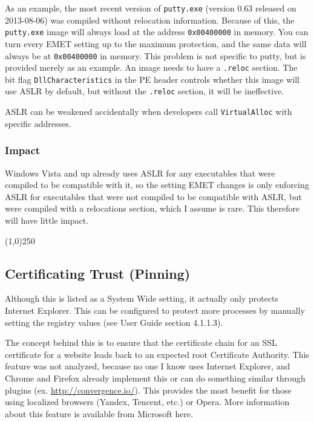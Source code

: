 \documentclass[]{article}
\newcommand{\sectionbreakline}[0]{\begin{center}\line(1,0){250}\end{center}}
\begin{document}
As an example, the most recent version of \texttt{putty.exe} (version 0.63 released on 2013-08-06) was compiled without relocation information. 
Because of this, the \texttt{putty.exe} image will always load at the address \texttt{0x00400000} in memory. You can turn every EMET setting up to the maximum protection, and the same data will always be at \texttt{0x00400000} in memory. This problem is not specific to putty, but is provided merely as an example. An image needs to have a \texttt{.reloc} section. 
The bit flag \texttt{DllCharacteristics} in the PE header controls whether this image will use ASLR by default, but without the \texttt{.reloc} section, it will be ineffective.

ASLR can be weakened accidentally when developers call \texttt{VirtualAlloc} with specific addresses.

\subsubsection{Impact}

Windows Vista and up already uses ASLR for any executables that were compiled to be compatible with it, so the setting EMET changes is only enforcing ASLR for executables that were not compiled to be compatible with ASLR, but were compiled with a relocations section, which I assume is rare.  This therefore will have little impact.

\sectionbreakline{}











\subsection{Certificating Trust (Pinning)}\label{pinning}

Although this is listed as a System Wide setting, it actually only
protects Internet Explorer. This can be configured to protect more
processes by manually setting the registry values (see User Guide
section 4.1.1.3\cite{emet4_1}).

The concept behind this is to ensure that the certificate chain for an
SSL certificate for a website leads back to an expected root Certificate
Authority. This feature was not analyzed, because no one I know uses
Internet Explorer, and Chrome and Firefox already implement this or can
do something similar through plugins (ex. \url{http://convergence.io/}). This
provides the most benefit for those using localized browsers (Yandex,
Tencent, etc.) or Opera. More information about this feature is
available from Microsoft here\cite{certificate_pinning}.
\end{document}
